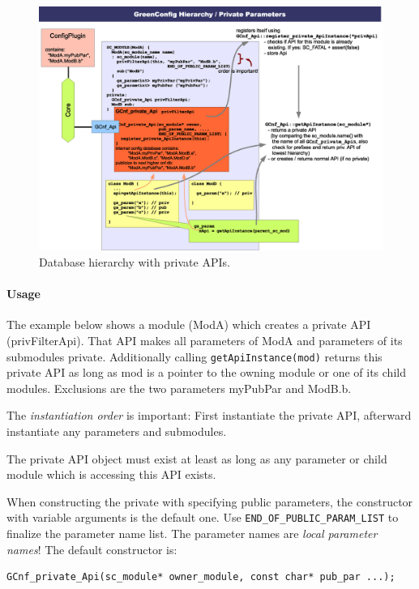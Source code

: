 \begin{landscape}
\begin{figure}[htbp]
	\centerline{
		\includegraphics[width=20cm]{DatabaseHierarchy.eps}}
	\caption{Database hierarchy with private APIs.}
	\label{fig:GCnfDatabaseHierarchy}
\end{figure}
\end{landscape}

\paragraph{Usage}
The example below shows a module ({\sffamily ModA}) which creates a private API ({\sffamily privFilterApi}). That API makes all parameters  of {\sffamily ModA} and parameters of its submodules private. Additionally calling \lstinline|getApiInstance(mod)| returns this private API as long as {\sffamily mod} is a pointer to the owning module or one of its child modules. Exclusions are the two parameters {\sffamily myPubPar} and {\sffamily ModB.b}.

The {\em instantiation order} is important: First instantiate the private API, afterward instantiate any parameters and submodules.

The private API object must exist at least as long as any parameter or child module which is accessing this API exists.

When constructing the private with specifying public parameters, the constructor with variable arguments is the default one. Use \lstinline|END_OF_PUBLIC_PARAM_LIST| to finalize the parameter name list. The parameter names are {\em local parameter names}! The default constructor is:
\begin{lstlisting}
GCnf_private_Api(sc_module* owner_module, const char* pub_par ...);
\end{lstlisting}

